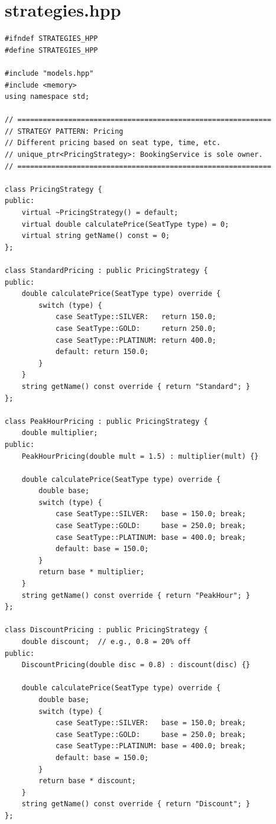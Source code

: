 \documentclass[11pt,a4paper]{article}
\begin{document}
\section{strategies.hpp}
\begin{lstlisting}[title={\texttt{strategies.hpp}}]
#ifndef STRATEGIES_HPP
#define STRATEGIES_HPP

#include "models.hpp"
#include <memory>
using namespace std;

// ============================================================
// STRATEGY PATTERN: Pricing
// Different pricing based on seat type, time, etc.
// unique_ptr<PricingStrategy>: BookingService is sole owner.
// ============================================================

class PricingStrategy {
public:
    virtual ~PricingStrategy() = default;
    virtual double calculatePrice(SeatType type) = 0;
    virtual string getName() const = 0;
};

class StandardPricing : public PricingStrategy {
public:
    double calculatePrice(SeatType type) override {
        switch (type) {
            case SeatType::SILVER:   return 150.0;
            case SeatType::GOLD:     return 250.0;
            case SeatType::PLATINUM: return 400.0;
            default: return 150.0;
        }
    }
    string getName() const override { return "Standard"; }
};

class PeakHourPricing : public PricingStrategy {
    double multiplier;
public:
    PeakHourPricing(double mult = 1.5) : multiplier(mult) {}

    double calculatePrice(SeatType type) override {
        double base;
        switch (type) {
            case SeatType::SILVER:   base = 150.0; break;
            case SeatType::GOLD:     base = 250.0; break;
            case SeatType::PLATINUM: base = 400.0; break;
            default: base = 150.0;
        }
        return base * multiplier;
    }
    string getName() const override { return "PeakHour"; }
};

class DiscountPricing : public PricingStrategy {
    double discount;  // e.g., 0.8 = 20% off
public:
    DiscountPricing(double disc = 0.8) : discount(disc) {}

    double calculatePrice(SeatType type) override {
        double base;
        switch (type) {
            case SeatType::SILVER:   base = 150.0; break;
            case SeatType::GOLD:     base = 250.0; break;
            case SeatType::PLATINUM: base = 400.0; break;
            default: base = 150.0;
        }
        return base * discount;
    }
    string getName() const override { return "Discount"; }
};


\end{lstlisting}
\end{document}
